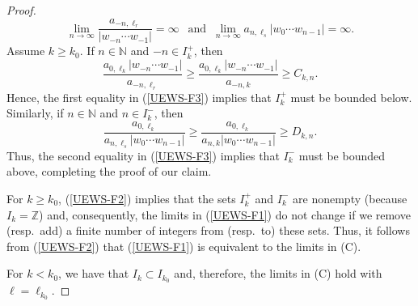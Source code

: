 \documentclass[12pt]{amsart}
\theoremstyle{theorem}
\theoremstyle{definition}
\theoremstyle{remark} \theoremstyle{question} \theoremstyle{example}
\newcommand{\N}{\mathbb{N}}   %
\newcommand{\Z}{\mathbb{Z}}   %
\begin{document}
\begin{proof}
\begin{equation}
\lim_{n \to \infty} \frac{a_{-n,\ell_r}}{|w_{-n} \cdots w_{-1}|} = \infty \ \ \text{ and } \
\lim_{n \to \infty} a_{n,\ell_s} |w_0 \cdots w_{n-1}| = \infty.
\end{equation}
Assume $k \geq k_0$. If $n \in \N$ and $-n \in I_k^+$, then
\[
\frac{a_{0,\ell_k} |w_{-n} \cdots w_{-1}|}{a_{-n,\ell_r}}   \geq \frac{a_{0,\ell_k} |w_{-n} \cdots w_{-1}|}{a_{-n,k}} \geq C_{k,n}.
\]
Hence, the first equality in (\ref{UEWS-F3}) implies that $I_k^+$ must be bounded below.
Similarly, if $n \in \N$ and $n \in I_k^-$, then
\[
\frac{a_{0,\ell_k}}{a_{n,\ell_s} |w_0 \cdots w_{n-1}|} \geq \frac{a_{0,\ell_k}}{a_{n,k} |w_0 \cdots w_{n-1}|} \geq D_{k,n}.
\]
Thus, the second equality in (\ref{UEWS-F3}) implies that $I_k^-$ must be bounded above, completing the proof of our claim.

For $k \geq k_0$, (\ref{UEWS-F2}) implies that the sets $I_k^+$ and $I_k^-$ are nonempty (because $I_k = \Z$) and, consequently, 
the limits in (\ref{UEWS-F1}) do not change if we remove (resp.\ add) a finite number of integers from (resp.\ to) these sets.
Thus, it follows from (\ref{UEWS-F2}) that (\ref{UEWS-F1}) is equivalent to the limits in (C).

For $k < k_0$, we have that $I_k \subset I_{k_0}$ and, therefore, the limits in (C) hold with $\ell = \ell_{k_0}$.


\end{proof}
\end{document}
